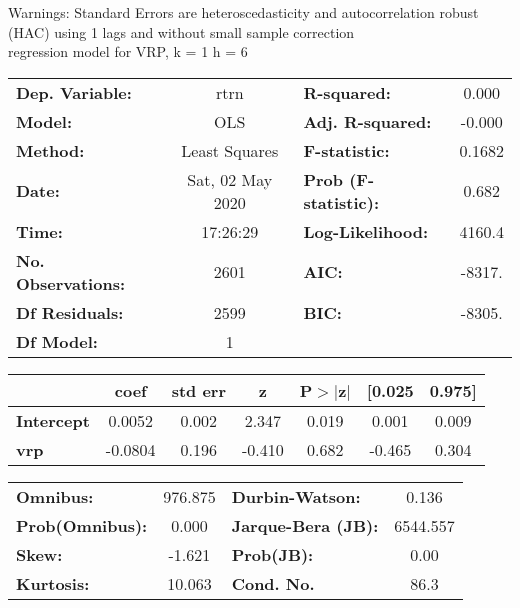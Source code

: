 Warnings: \newline
 [1] Standard Errors are heteroscedasticity and autocorrelation robust (HAC) using 1 lags and without small sample correction\\ 

regression model for VRP, k = 1 h = 6\begin{center}
\begin{tabular}{lclc}
\toprule
\textbf{Dep. Variable:}    &       rtrn       & \textbf{  R-squared:         } &     0.000   \\
\textbf{Model:}            &       OLS        & \textbf{  Adj. R-squared:    } &    -0.000   \\
\textbf{Method:}           &  Least Squares   & \textbf{  F-statistic:       } &    0.1682   \\
\textbf{Date:}             & Sat, 02 May 2020 & \textbf{  Prob (F-statistic):} &    0.682    \\
\textbf{Time:}             &     17:26:29     & \textbf{  Log-Likelihood:    } &    4160.4   \\
\textbf{No. Observations:} &        2601      & \textbf{  AIC:               } &    -8317.   \\
\textbf{Df Residuals:}     &        2599      & \textbf{  BIC:               } &    -8305.   \\
\textbf{Df Model:}         &           1      & \textbf{                     } &             \\
\bottomrule
\end{tabular}
\begin{tabular}{lcccccc}
                   & \textbf{coef} & \textbf{std err} & \textbf{z} & \textbf{P$> |$z$|$} & \textbf{[0.025} & \textbf{0.975]}  \\
\midrule
\textbf{Intercept} &       0.0052  &        0.002     &     2.347  &         0.019        &        0.001    &        0.009     \\
\textbf{vrp}       &      -0.0804  &        0.196     &    -0.410  &         0.682        &       -0.465    &        0.304     \\
\bottomrule
\end{tabular}
\begin{tabular}{lclc}
\textbf{Omnibus:}       & 976.875 & \textbf{  Durbin-Watson:     } &    0.136  \\
\textbf{Prob(Omnibus):} &   0.000 & \textbf{  Jarque-Bera (JB):  } & 6544.557  \\
\textbf{Skew:}          &  -1.621 & \textbf{  Prob(JB):          } &     0.00  \\
\textbf{Kurtosis:}      &  10.063 & \textbf{  Cond. No.          } &     86.3  \\
\bottomrule
\end{tabular}
\end{center}

